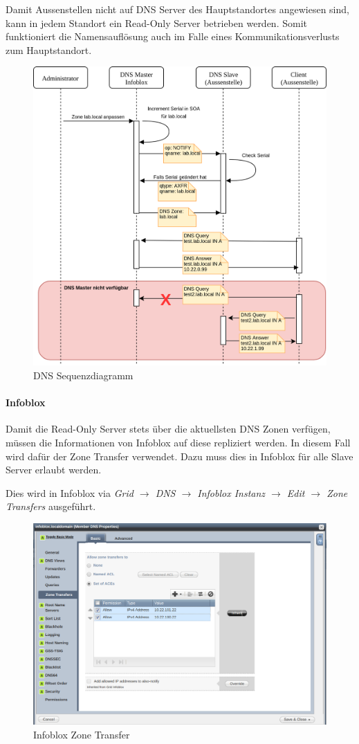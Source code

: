Damit Aussenstellen nicht auf DNS Server des Hauptstandortes angewiesen sind, kann in jedem Standort ein Read-Only Server betrieben werden. Somit funktioniert die Namensauflösung auch im Falle eines Kommunikationsverlusts zum Hauptstandort. 

\begin{figure}[H]
	\centering
	\includegraphics[width=0.8\linewidth]{img/Absicherung/DNS_Sequenzdiagram.png}
	\caption{DNS Sequenzdiagramm}
	\label{fig:DNS Sequenzdiagramm}
\end{figure}

\paragraph{Infoblox}

Damit die Read-Only Server stets über die aktuellsten DNS Zonen verfügen, müssen die Informationen von Infoblox auf diese repliziert werden. In diesem Fall wird dafür der Zone Transfer verwendet. Dazu muss dies in Infoblox für alle Slave Server erlaubt werden. 

Dies wird in Infoblox via \textit{Grid $\rightarrow$ DNS $\rightarrow$ Infoblox Instanz $\rightarrow$ Edit $\rightarrow$ Zone Transfers} ausgeführt.

\begin{figure}[H]
	\centering
	\includegraphics[width=0.8\linewidth]{img/Absicherung/Infoblox_Zone_Transfer.png}
	\caption{Infoblox Zone Transfer}
	\label{fig:Infoblox Zone Transfer}
\end{figure}

